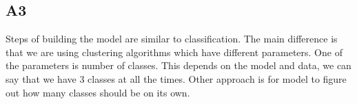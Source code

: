 \subsection{A3}\label{A3}

Steps of building the model are similar to classification. The main difference is that we are using clustering algorithms which have different parameters. One of the parameters is number of classes. This depends on the model and data, we can say that we have 3 classes at all the times. Other approach is for model to figure out how many classes should be on its own.
